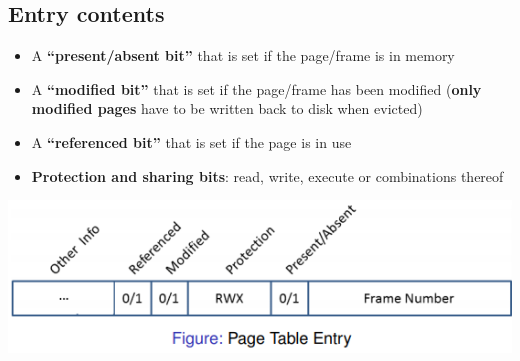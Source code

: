 \documentclass{article}
\begin{document}
\subsection{Entry contents}
\begin{itemize}
	\item A \textbf{“present/absent bit”} that is set if the page/frame is in memory
	\item A \textbf{“modified bit”} that is set if the page/frame has been modified (\textbf{only modified pages} have to be written back to disk when evicted)
	\item A \textbf{“referenced bit”} that is set if the page is in use
	\item \textbf{Protection and sharing bits}: read, write, execute or combinations thereof
\end{itemize}
\begin{center}
	\includegraphics[scale=0.6]{page_table_entry.png}
\end{center}
\end{document}
